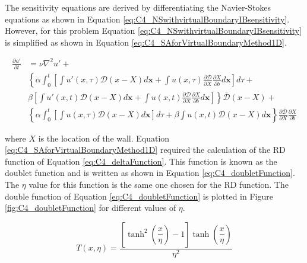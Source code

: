 The sensitivity equations are derived by differentiating the Navier-Stokes equations as shown in Equation \eqref{eq:C4_NSwithvirtualBoundaryIBsensitivity}. However, for this problem Equation \eqref{eq:C4_NSwithvirtualBoundaryIBsensitivity} is simplified as shown in Equation \eqref{eq:C4_SAforVirtualBoundaryMethod1D}.

\begin{align}\label{eq:C4_SAforVirtualBoundaryMethod1D}
    \frac{\partial u'}{\partial t}
    &= 
    \nu \nabla^2 u' + \nonumber \\
    &\left\{
    \alpha
    \int_0^t
    \left[
        \int u'(x, \tau) \mathcal{D}(x - X) d\mathbf{x} + 
        \int u(x, \tau) \frac{\partial \mathcal{D}}{\partial X} \frac{\partial X}{\partial b} d\mathbf{x}
    \right] d\tau \right.
    + \nonumber \\
    &
    \left.
    \beta
    \left[
    \int u'(x, t) \mathcal{D}(x - X) d\mathbf{x} +
    \int u(x, t) \frac{\partial \mathcal{D}}{\partial X} \frac{\partial X}{\partial b} d\mathbf{x}
    \right]
    \right\} \bar{\mathcal{D}}(x - X) + \nonumber \\
    &\left\{
    \alpha
    \int_0^t
    \left[
        \int u(x, \tau) \mathcal{D}(x - X) d\mathbf{x}
    \right] d\tau
    +
    \beta
    \int u(x, t) \mathcal{D}(x - X) d\mathbf{x}
    \right\}
    \frac{\partial \bar{\mathcal{D}}}{\partial X} \frac{\partial X}{\partial b}
\end{align}

where $X$ is the location of the wall. Equation \eqref{eq:C4_SAforVirtualBoundaryMethod1D} required the calculation of the RD function of Equation \eqref{eq:C4_deltaFunction}. This function is known as the doublet function \cite{kamaraju2009linear} and is written as shown in Equation \eqref{eq:C4_doubletFunction}. The $\eta$ value for this function is the same one chosen for the RD function. The double function of Equation \eqref{eq:C4_doubletFunction} is plotted in Figure \ref{fig:C4_doubletFunction} for different values of $\eta$.

\begin{equation}\label{eq:C4_doubletFunction}
    T(x, \eta) = 
    \frac{\left[ \tanh^{2}{\left(\dfrac{x}{\eta} \right)} - 1 \right] \tanh{\left( \dfrac{x}{\eta} \right)}}{\eta^2} 
\end{equation}

